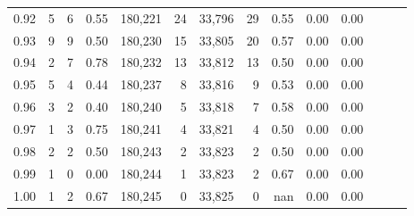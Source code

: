 \begin{tabular}{rrrrrrrrrrrrrr}
0.92 &      5 &      6 &  0.55 &  180,221 &       24 &  33,796 &      29 &  0.55 &  0.00 &      0.00 \\
0.93 &      9 &      9 &  0.50 &  180,230 &       15 &  33,805 &      20 &  0.57 &  0.00 &      0.00 \\
0.94 &      2 &      7 &  0.78 &  180,232 &       13 &  33,812 &      13 &  0.50 &  0.00 &      0.00 \\
0.95 &      5 &      4 &  0.44 &  180,237 &        8 &  33,816 &       9 &  0.53 &  0.00 &      0.00 \\
0.96 &      3 &      2 &  0.40 &  180,240 &        5 &  33,818 &       7 &  0.58 &  0.00 &      0.00 \\
0.97 &      1 &      3 &  0.75 &  180,241 &        4 &  33,821 &       4 &  0.50 &  0.00 &      0.00 \\
0.98 &      2 &      2 &  0.50 &  180,243 &        2 &  33,823 &       2 &  0.50 &  0.00 &      0.00 \\
0.99 &      1 &      0 &  0.00 &  180,244 &        1 &  33,823 &       2 &  0.67 &  0.00 &      0.00 \\
1.00 &      1 &      2 &  0.67 &  180,245 &        0 &  33,825 &       0 &   nan &  0.00 &      0.00 \\
\bottomrule
\end{tabular}
